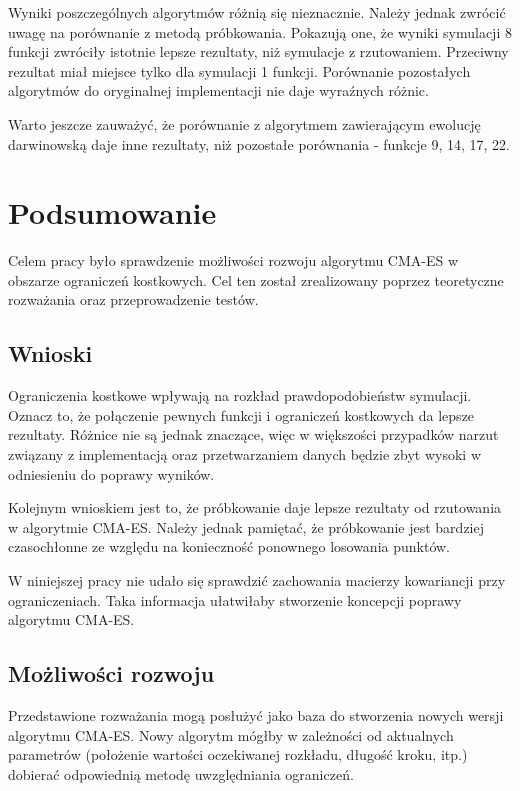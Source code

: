 \documentclass{mini}
\begin{document}
Wyniki poszczególnych algorytmów różnią się nieznacznie. Należy jednak zwrócić uwagę na porównanie z metodą próbkowania. Pokazują one, że wyniki symulacji 8 funkcji zwróciły istotnie lepsze rezultaty, niż symulacje z rzutowaniem. Przeciwny rezultat miał miejsce tylko dla symulacji 1 funkcji. Porównanie pozostałych algorytmów do oryginalnej implementacji nie daje wyraźnych różnic.

Warto jeszcze zauważyć, że porównanie z algorytmem zawierającym ewolucję darwinowską daje inne rezultaty, niż pozostałe porównania - funkcje 9, 14, 17, 22.


\pagebreak

\section{Podsumowanie}
Celem pracy było sprawdzenie możliwości rozwoju algorytmu CMA-ES w obszarze ograniczeń kostkowych. Cel ten został zrealizowany poprzez teoretyczne rozważania oraz przeprowadzenie testów.

\subsection{Wnioski}
Ograniczenia kostkowe wpływają na rozkład prawdopodobieństw symulacji. Oznacz to, że połączenie pewnych funkcji i ograniczeń kostkowych da lepsze rezultaty. Różnice nie są jednak znaczące, więc w większości przypadków narzut związany z implementacją oraz przetwarzaniem danych będzie zbyt wysoki w odniesieniu do poprawy wyników.

Kolejnym wnioskiem jest to, że próbkowanie daje lepsze rezultaty od rzutowania w algorytmie CMA-ES. Należy jednak pamiętać, że próbkowanie jest bardziej czasochłonne ze względu na konieczność ponownego losowania punktów.

W niniejszej pracy nie udało się sprawdzić zachowania macierzy kowariancji przy ograniczeniach. Taka informacja ułatwiłaby stworzenie koncepcji poprawy algorytmu CMA-ES.

\subsection{Możliwości rozwoju}
Przedstawione rozważania mogą posłużyć jako baza do stworzenia nowych wersji algorytmu CMA-ES. Nowy algorytm mógłby w zależności od aktualnych parametrów (położenie wartości oczekiwanej rozkładu, długość kroku, itp.) dobierać odpowiednią metodę uwzględniania ograniczeń.
\end{document}

